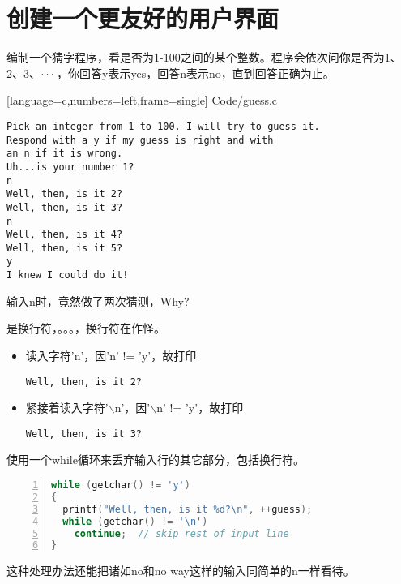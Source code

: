 \section{创建一个更友好的用户界面}
\begin{frame}[fragile]\ft{\secname}
编制一个猜字程序，看是否为1-100之间的某个整数。程序会依次问你是否为1、2、3、$\cdots$，你回答y表示yes，回答n表示no，直到回答正确为止。
\end{frame}


\begin{frame}\ft{\secname}
  
  [language=c,numbers=left,frame=single]
  {Code/guess.c}
\end{frame}

\begin{frame}[fragile]\ft{\secname}
\begin{lstlisting}[backgroundcolor=\color{blue!20}]
Pick an integer from 1 to 100. I will try to guess it.
Respond with a y if my guess is right and with
an n if it is wrong.
Uh...is your number 1?
n
Well, then, is it 2?
Well, then, is it 3?
n
Well, then, is it 4?
Well, then, is it 5?
y
I knew I could do it!
\end{lstlisting}
\end{frame}

\begin{frame}[fragile]\ft{\secname}
输入n时，竟然做了两次猜测，Why? \pause \vspace{0.1in}

是换行符，。。。，换行符在作怪。
\pause \vspace{0.1in}

\begin{itemize}
\item \tf 读入字符'n'，因'n' != 'y'，故打印
\begin{lstlisting}
Well, then, is it 2?
\end{lstlisting}
\item 紧接着读入字符'$\backslash$n'，因'$\backslash$n' != 'y'，故打印
\begin{lstlisting}
Well, then, is it 3?
\end{lstlisting}
\end{itemize}
\end{frame}

\begin{frame}[fragile]
使用一个while循环来丢弃输入行的其它部分，包括换行符。
\begin{lstlisting}[language=c,numbers=left,frame=single]
while (getchar() != 'y')
{
  printf("Well, then, is it %d?\n", ++guess);
  while (getchar() != '\n')
    continue;  // skip rest of input line
}
\end{lstlisting}
这种处理办法还能把诸如no和no way这样的输入同简单的n一样看待。
\end{frame}

